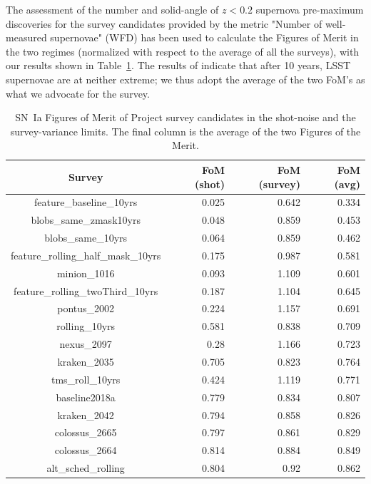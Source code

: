 \documentclass[a4paper,10pt]{article}
\begin{document}
The assessment of the number and solid-angle of $z<0.2$ supernova pre-maximum discoveries 
for the survey candidates provided by the metric "Number of well-measured supernovae" (WFD)  has been used to calculate the Figures of Merit in the two regimes 
(normalized with respect to the average of all the surveys),
with our results shown in 
Table~\ref{table:ref}.  The results of \cite{howlett}  indicate that after 10 years,
LSST supernovae are at neither extreme; we thus adopt the average of the two FoM's as what we advocate for the survey.


\begin{table}
\caption{SN~Ia Figures of Merit of Project survey candidates
in  the shot-noise and the survey-variance limits.  The final column is the average
of the two Figures of the Merit.\label{table:ref}}
\centering
\begin{tabular}{crrr}
  \hline
  \hline
Survey & FoM (shot) & FoM (survey) & FoM (avg)\\
\hline
\hline
feature\_baseline\_10yrs & 0.025 & 0.642 & 0.334  \\
blobs\_same\_zmask10yrs & 0.048 & 0.859 & 0.453  \\
blobs\_same\_10yrs & 0.064 & 0.859 & 0.462  \\
feature\_rolling\_half\_mask\_10yrs & 0.175 & 0.987 & 0.581  \\
minion\_1016 & 0.093 & 1.109 & 0.601  \\
feature\_rolling\_twoThird\_10yrs & 0.187 & 1.104 & 0.645  \\
pontus\_2002 & 0.224 & 1.157 & 0.691  \\
rolling\_10yrs & 0.581 & 0.838 & 0.709  \\
nexus\_2097 & 0.28 & 1.166 & 0.723  \\
kraken\_2035 & 0.705 & 0.823 & 0.764  \\
tms\_roll\_10yrs & 0.424 & 1.119 & 0.771  \\
baseline2018a & 0.779 & 0.834 & 0.807  \\
kraken\_2042 & 0.794 & 0.858 & 0.826  \\
colossus\_2665 & 0.797 & 0.861 & 0.829  \\
colossus\_2664 & 0.814 & 0.884 & 0.849  \\
alt\_sched\_rolling & 0.804 & 0.92 & 0.862  \\

\end{tabular}
\end{table}
\end{document}
